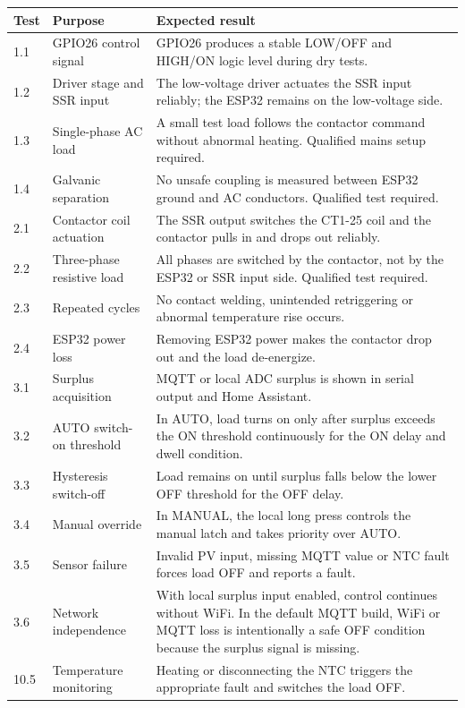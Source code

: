 \documentclass[12pt,a4paper]{article}
\begin{document}
\begin{longtable}{p{}p{}p{}}
\toprule
Test & Purpose & Expected result\\
\midrule
\endhead
1.1 & GPIO26 control signal & GPIO26 produces a stable LOW/OFF and HIGH/ON logic
level during dry tests.\\
1.2 & Driver stage and SSR input & The low-voltage driver actuates the SSR input
reliably; the ESP32 remains on the low-voltage side.\\
1.3 & Single-phase AC load & A small test load follows the contactor command
without abnormal heating. Qualified mains setup required.\\
1.4 & Galvanic separation & No unsafe coupling is measured between ESP32 ground
and AC conductors. Qualified test required.\\
2.1 & Contactor coil actuation & The SSR output switches the CT1-25 coil and the
contactor pulls in and drops out reliably.\\
2.2 & Three-phase resistive load & All phases are switched by the contactor, not
by the ESP32 or SSR input side. Qualified test required.\\
2.3 & Repeated cycles & No contact welding, unintended retriggering or abnormal
temperature rise occurs.\\
2.4 & ESP32 power loss & Removing ESP32 power makes the contactor drop out and
the load de-energize.\\
3.1 & Surplus acquisition & MQTT or local ADC surplus is shown in serial output
and Home Assistant.\\
3.2 & AUTO switch-on threshold & In AUTO, load turns on only after surplus exceeds
the ON threshold continuously for the ON delay and dwell condition.\\
3.3 & Hysteresis switch-off & Load remains on until surplus falls below the lower
OFF threshold for the OFF delay.\\
3.4 & Manual override & In MANUAL, the local long press controls the manual latch
and takes priority over AUTO.\\
3.5 & Sensor failure & Invalid PV input, missing MQTT value or NTC fault forces
load OFF and reports a fault.\\
3.6 & Network independence & With local surplus input enabled, control continues
without WiFi. In the default MQTT build, WiFi or MQTT loss is intentionally a safe
OFF condition because the surplus signal is missing.\\
10.5 & Temperature monitoring & Heating or disconnecting the NTC triggers the
appropriate fault and switches the load OFF.\\
\bottomrule
\end{longtable}
\end{document}
